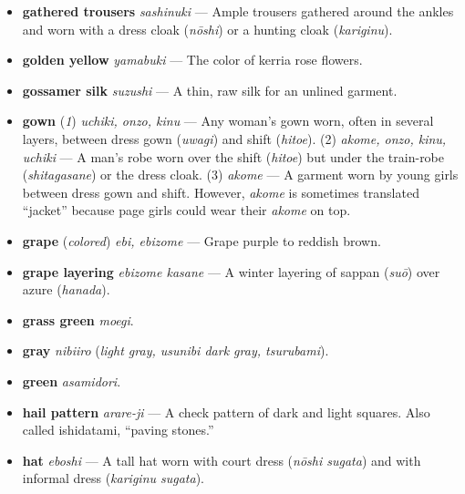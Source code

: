 \documentclass{article}
\begin{document}
\begin{multicols*}{2}
\begin{itemize}[
			label=,
			leftmargin=0em,
			rightmargin=-1.5em,
			itemindent=-2em,
			nosep,
		]
		\item \textbf{gathered trousers} \textit{sashinuki} --- Ample trousers gathered around the ankles and worn with a dress cloak (\textit{nōshi}) or a hunting cloak (\textit{kariginu}).

		\item \textbf{golden yellow} \textit{yamabuki} --- The color of kerria rose flowers.

		\item \textbf{gossamer silk} \textit{suzushi} --- A thin, raw silk for an unlined garment.

		\item \textbf{gown} (\textit{1}) \textit{uchiki, onzo, kinu} --- Any woman's gown worn, often in several layers, between dress gown (\textit{uwagi}) and shift (\textit{hitoe}). (2) \textit{akome, onzo, kinu, uchiki} --- A man's robe worn over the shift (\textit{hitoe}) but under the train-robe (\textit{shitagasane}) or the dress cloak. (3) \textit{akome} --- A garment worn by young girls between dress gown and shift. However, \textit{akome} is sometimes translated “jacket” because page girls could wear their \textit{akome} on top.

		\item \textbf{grape} (\textit{colored}) \textit{ebi, ebizome} --- Grape purple to reddish brown.

		\item \textbf{grape layering} \textit{ebizome kasane} --- A winter layering of sappan (\textit{suō}) over azure (\textit{hanada}).

		\item \textbf{grass green} \textit{moegi}.

		\item \textbf{gray} \textit{nibiiro} (\textit{light gray, \textit{usunibi} dark gray, \textit{tsurubami}}).

		\item \textbf{green} \textit{asamidori}.

		\item \textbf{hail pattern} \textit{arare-ji} --- A check pattern of dark and light squares. Also called ishidatami, “paving stones.”

		\item \textbf{hat} \textit{eboshi} --- A tall hat worn with court dress (\textit{nōshi sugata}) and with informal dress (\textit{kariginu sugata}).


\end{itemize}
\end{multicols*}
\end{document}

